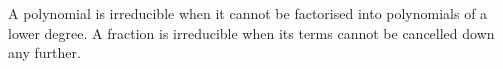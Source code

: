 A polynomial is irreducible when it cannot be factorised into polynomials of
a lower degree.
A fraction is irreducible when its terms cannot be cancelled down any further.